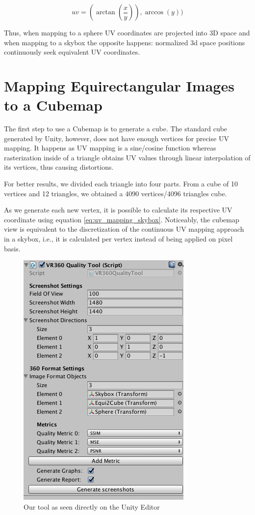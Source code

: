 \documentclass[12pt]{article}
\begin{document}
\begin{equation}
uv = (\arctan(\frac{x}{y})), \arccos(y))
\label{eq:uv_mapping_skybox}
\end{equation}

Thus, when mapping to a sphere UV coordinates are projected into 3D space and when mapping to a skybox the opposite happens: normalized 3d space positions continuously seek equivalent UV coordinates.

\section{Mapping Equirectangular Images to a Cubemap}
The first step to use a Cubemap is to generate a cube. The standard cube generated by Unity, however, does not have enough vertices for precise UV mapping. It happens as UV mapping is a sine/cosine function whereas rasterization inside of a triangle obtains UV values through linear interpolation of its vertices, thus causing distortions.

For better results, we divided each triangle into four parts. From a cube of 10 vertices and 12 triangles, we obtained a 4090 vertices/4096 triangles cube.

As we generate each new vertex, it is possible to calculate its respective UV coordinate using equation \ref{eq:uv_mapping_skybox}. Noticeably, the cubemap view is equivalent to the discretization of the continuous UV mapping approach in a skybox, i.e., it is calculated per vertex instead of being applied on pixel basis.

\begin{figure}
    \centering
    \includegraphics{images/tool.png}
    \caption{Our tool as seen directly on the Unity Editor}
    \label{fig:tool}
\end{figure}
\end{document}
